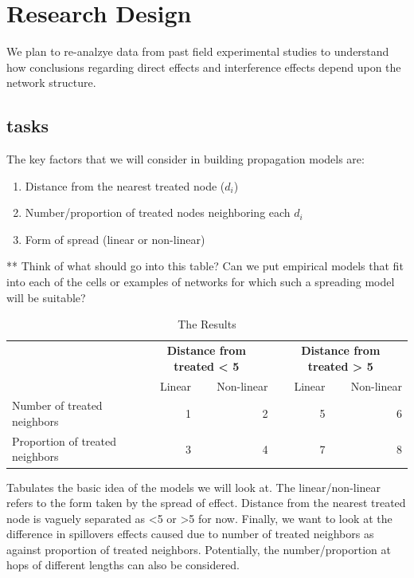 \documentclass[12pt]{article}
\begin{document}
\section{Research Design}

We plan to re-analzye data from past field experimental studies to understand how conclusions regarding direct effects and interference effects depend upon the network structure.

\subsection{tasks}

The key factors that we will consider in building propagation models are: \\

\begin{enumerate}

\item Distance from the nearest treated node ($d_i$)
\item Number/proportion of treated nodes neighboring each $d_i$
\item Form of spread (linear or non-linear)

\end{enumerate}

** Think of what should go into this table? Can we put empirical models that fit into each of the cells or examples of networks for which such a spreading model will be suitable?

\begin{table}
        \begin{tabular}{lrrrr}\toprule
            &\multicolumn{2}{c}{\textbf{Distance from treated < 5}}&\multicolumn{2}{c}{\textbf{Distance from treated > 5}}
            \\\cmidrule(r){2-3}\cmidrule(r){4-5}
            &Linear&Non-linear&Linear&Non-linear\\\midrule
            Number of treated neighbors    & 1 & 2
                    & 5 & 6\\
            Proportion of treated neighbors   & 3 & 4
                    & 7 & 8
            \\\bottomrule
        \end{tabular}
        \caption{The Results}\label{Tab2}
\end{table} 

Tabulates the basic idea of the models we will look at. The linear/non-linear refers to the form taken by the spread of effect. Distance from the nearest treated node is vaguely separated as <5 or >5 for now. Finally, we want to look at the difference in spillovers effects caused due to number of treated neighbors as against proportion of treated neighbors. Potentially, the number/proportion at hops of different lengths can also be considered.
\end{document}
